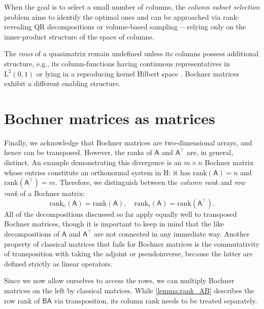 \documentclass[onefignum,onetabnum]{siamart250211}
\renewenvironment{equation*}{\[}{\]\ignorespacesafterend}
\newcommand{\Hilb}{\mathrm{H}}
\newcommand{\Ell}{\mathrm{L}}
\newcommand{\Batrix}[1]{\bm{\Matrix{#1}}}
\newcommand{\Matrix}[1]{\mathsf{#1}}
\newcommand{\trans}{\intercal}
\newcommand{\rank}[2][]{\mathrm{rank} #1( #2 #1)}
\newcommand{\Rank}[3][]{\mathrm{rank_{#2}} #1( #3 #1)}
\begin{document}
When the goal is to select a small number of columns, the \emph{column subset selection} problem aims to identify the optimal ones and can be approached via rank-revealing QR decompositions or volume-based sampling \cite{kressner2025approximation}---relying only on the inner-product structure of the space of columns.

The \emph{rows} of a quasimatrix remain undefined unless its columns possess additional structure, e.g., its column-functions having continuous representatives in $\Ell^2(0,1)$ \cite{townsend2015continuous} or lying in a reproducing kernel Hilbert space \cite{shustin2022semi}.
Bochner matrices exhibit a different enabling structure.
\section{Bochner matrices as matrices}
\label{sec:bmx_m}
Finally, we acknowledge that Bochner matrices are two-dimensional arrays, and hence can be transposed.
However, the ranks of $\Batrix{A}$ and $\Batrix{A}^{\trans}$ are, in general, distinct.
An example demonstrating this divergence is an $m \times n$ Bochner matrix whose entries constitute an orthonormal system in $\Hilb$: it has $\rank{\Batrix{A}} = n$ and $\rank{\Batrix{A}^\trans} = m$.
Therefore, we distinguish between the \emph{column rank} and \emph{row rank} of a Bochner matrix:
\begin{equation*}
    \Rank{c}{\Batrix{A}} = \rank{\Batrix{A}}, \quad \Rank{r}{\Batrix{A}} = \rank{\Batrix{A}^\trans}.
\end{equation*}
All of the decompositions discussed so far apply equally well to transposed Bochner matrices, though it is important to keep in mind that the like decompositions of $\Batrix{A}$ and $\Batrix{A}^\trans$ are not connected in any immediate way.
Another property of classical matrices that fails for Bochner matrices is the commutativity of transposition with taking the adjoint or pseudoinverse, because the latter are defined strictly as linear operators.

Since we now allow ourselves to access the rows, we can multiply Bochner matrices on the left by classical matrices.
While \cref{lemma:rank_AB} describes the row rank of $\Matrix{B} \Batrix{A}$ via transposition, its column rank needs to be treated separately.
\end{document}
